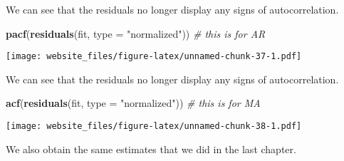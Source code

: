 \documentclass[]{book}
\newenvironment{Shaded}{\begin{snugshade}}{\end{snugshade}}
\newcommand{\KeywordTok}[1]{\textcolor[rgb]{0.13,0.29,0.53}{\textbf{#1}}}
\newcommand{\DataTypeTok}[1]{\textcolor[rgb]{0.13,0.29,0.53}{#1}}
\newcommand{\StringTok}[1]{\textcolor[rgb]{0.31,0.60,0.02}{#1}}
\newcommand{\CommentTok}[1]{\textcolor[rgb]{0.56,0.35,0.01}{\textit{#1}}}
\newcommand{\NormalTok}[1]{#1}
\begin{document}
\newpage 

We can see that the residuals no longer display any signs of
autocorrelation.

\begin{Shaded}
\begin{Highlighting}[]
\KeywordTok{pacf}\NormalTok{(}\KeywordTok{residuals}\NormalTok{(fit, }\DataTypeTok{type =} \StringTok{"normalized"}\NormalTok{)) }\CommentTok{# this is for AR}
\end{Highlighting}
\end{Shaded}

\texttt{[image: website\_files/figure-latex/unnamed-chunk-37-1.pdf]}

\newpage

We can see that the residuals no longer display any signs of
autocorrelation.

\begin{Shaded}
\begin{Highlighting}[]
\KeywordTok{acf}\NormalTok{(}\KeywordTok{residuals}\NormalTok{(fit, }\DataTypeTok{type =} \StringTok{"normalized"}\NormalTok{)) }\CommentTok{# this is for MA}
\end{Highlighting}
\end{Shaded}

\texttt{[image: website\_files/figure-latex/unnamed-chunk-38-1.pdf]}

\newpage

We also obtain the same estimates that we did in the last chapter.
\end{document}
